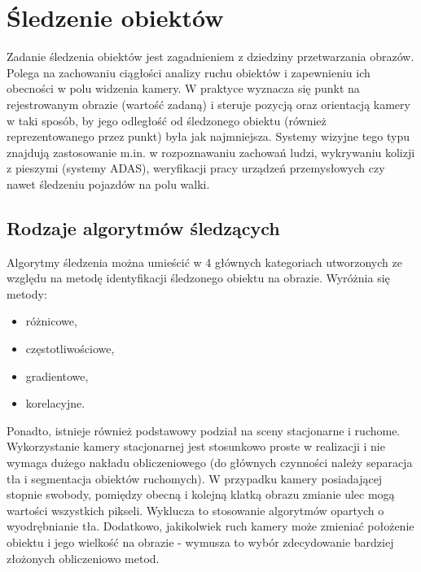 
\chapter{Śledzenie obiektów}
\label{cha:sledzenieObiektow}

Zadanie śledzenia obiektów jest zagadnieniem z dziedziny przetwarzania obrazów. Polega na zachowaniu ciągłości analizy ruchu obiektów i zapewnieniu ich obecności w polu widzenia kamery. W praktyce wyznacza się punkt na rejestrowanym obrazie (wartość zadaną) i steruje pozycją oraz orientacją kamery w taki sposób, by jego odległość od śledzonego obiektu (również reprezentowanego przez punkt) była jak najmniejsza. Systemy wizyjne tego typu znajdują zastosowanie m.in. w rozpoznawaniu zachowań ludzi, wykrywaniu kolizji z pieszymi (systemy ADAS), weryfikacji pracy urządzeń przemysłowych czy nawet śledzeniu pojazdów na polu walki.


\section{Rodzaje algorytmów śledzących}
\label{sec:algorytmySledzace}

Algorytmy śledzenia można umieścić w 4 głównych kategoriach utworzonych ze względu na metodę identyfikacji śledzonego obiektu na obrazie. 
Wyróżnia się metody:
\begin{itemize}
	\item różnicowe,
	\item częstotliwościowe,
	\item gradientowe,
	\item korelacyjne.
\end{itemize}

Ponadto, istnieje również podstawowy podział na sceny stacjonarne i ruchome. 
Wykorzystanie kamery stacjonarnej jest stosunkowo proste w realizacji i nie wymaga dużego nakładu obliczeniowego (do głównych czynności należy separacja tła i segmentacja obiektów ruchomych). %
W przypadku kamery posiadającej stopnie swobody, pomiędzy obecną i kolejną klatką obrazu zmianie ulec mogą wartości wszystkich pikseli. %
Wyklucza to stosowanie algorytmów opartych o wyodrębnianie tła. 
Dodatkowo, jakikolwiek ruch kamery może zmieniać położenie obiektu i jego wielkość na obrazie - wymusza to wybór zdecydowanie bardziej złożonych obliczeniowo metod. %


